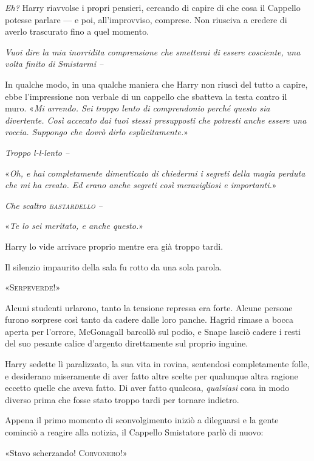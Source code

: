 \textit{Eh?} Harry riavvolse i propri pensieri, cercando di capire di che cosa il Cappello potesse parlare — e poi, all’improvviso, comprese. Non riusciva a credere di averlo trascurato fino a quel momento.

\textit{Vuoi dire la mia inorridita comprensione che smetterai di essere cosciente, una volta finito di Smistarmi –}

In qualche modo, in una qualche maniera che Harry non riuscì del tutto a capire, ebbe l’impressione non verbale di un cappello che sbatteva la testa contro il muro. «\textit{Mi arrendo. Sei troppo lento di comprendonio perché questo sia divertente. Così accecato dai tuoi stessi presupposti che potresti anche essere una roccia. Suppongo che dovrò dirlo esplicitamente.}»

\textit{Troppo l-l-lento –}

«\textit{Oh, e hai completamente dimenticato di chiedermi i segreti della magia perduta che mi ha creato. Ed erano anche segreti così meravigliosi e importanti.}»

\textit{Che scaltro \textsc{bastardello} –}

«\textit{Te lo sei meritato, e anche questo.}»

Harry lo vide arrivare proprio mentre era già troppo tardi.

Il silenzio impaurito della sala fu rotto da una sola parola.

«\textsc{Serpeverde!}»

Alcuni studenti urlarono, tanto la tensione repressa era forte. Alcune persone furono sorprese così tanto da cadere dalle loro panche. Hagrid rimase a bocca aperta per l’orrore, McGonagall barcollò sul podio, e Snape lasciò cadere i resti del suo pesante calice d’argento direttamente sul proprio inguine.

Harry sedette lì paralizzato, la sua vita in rovina, sentendosi completamente folle, e desiderano miseramente di aver fatto altre scelte per qualunque altra ragione eccetto quelle che aveva fatto. Di aver fatto qualcosa, \textit{qualsiasi} cosa in modo diverso prima che fosse stato troppo tardi per tornare indietro.

Appena il primo momento di sconvolgimento iniziò a dileguarsi e la gente cominciò a reagire alla notizia, il Cappello Smistatore parlò di nuovo:

«Stavo scherzando! \textsc{Corvonero!}»





